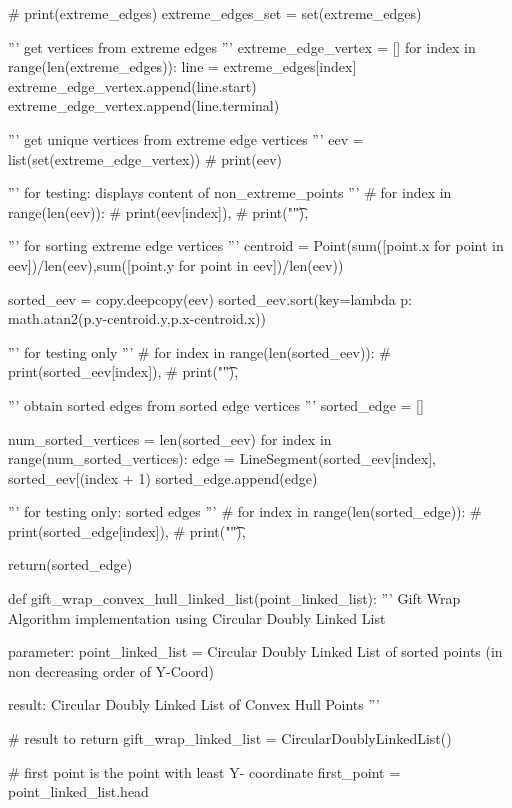 \documentclass[a4paper,12pt]{article}
\begin{document}
\begin{spacing}{1}
\begin{footnotesize}
\begin{spverbatim}
    # print(extreme_edges)
    extreme_edges_set = set(extreme_edges)

    ''' get vertices from extreme edges '''
    extreme_edge_vertex = []
    for index in range(len(extreme_edges)):
        line = extreme_edges[index]
        extreme_edge_vertex.append(line.start)
        extreme_edge_vertex.append(line.terminal)

    ''' get unique vertices from extreme edge vertices '''
    eev = list(set(extreme_edge_vertex))
    # print(eev)

    ''' for testing: displays content of non_extreme_points '''
    # for index in range(len(eev)):
    #     print(eev[index]),
    #     print("\t"),

    ''' for sorting extreme edge vertices '''
    centroid = Point(sum([point.x for point in eev])/len(eev),sum([point.y for point in eev])/len(eev))

    sorted_eev = copy.deepcopy(eev)
    sorted_eev.sort(key=lambda p: math.atan2(p.y-centroid.y,p.x-centroid.x))

    ''' for testing only '''
    # for index in range(len(sorted_eev)):
    #     print(sorted_eev[index]),
    #     print("\t"),

    ''' obtain sorted edges from sorted edge vertices '''
    sorted_edge = []

    num_sorted_vertices = len(sorted_eev)
    for index in range(num_sorted_vertices):
        edge = LineSegment(sorted_eev[index], sorted_eev[(index + 1) %
        sorted_edge.append(edge)

    ''' for testing only: sorted edges '''
    # for index in range(len(sorted_edge)):
    #     print(sorted_edge[index]),
    #     print("\t"),

    return(sorted_edge)

def gift_wrap_convex_hull_linked_list(point_linked_list):
    ''' Gift Wrap Algorithm implementation using Circular Doubly Linked List

        parameter: point_linked_list = Circular Doubly Linked List of sorted
                   points (in non decreasing order of Y-Coord)

        result: Circular Doubly Linked List of Convex Hull Points
    '''

    # result to return
    gift_wrap_linked_list = CircularDoublyLinkedList()

    # first point is the point with least Y- coordinate
    first_point = point_linked_list.head


\end{spverbatim}
\end{footnotesize}
\end{spacing}
\end{document}
